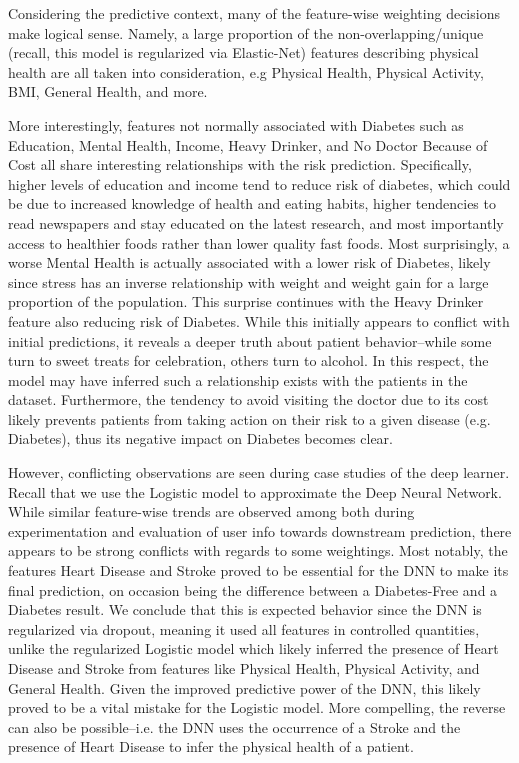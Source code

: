 \documentclass[conference]{IEEEtran}
\begin{document}
    Considering the predictive context, many of the feature-wise weighting decisions make logical sense. Namely, a large proportion of the non-overlapping/unique (recall, this model is regularized via Elastic-Net) features describing physical health are all taken into consideration, e.g Physical Health, Physical Activity, BMI, General Health, and more.

    More interestingly, features not normally associated with Diabetes such as Education, Mental Health, Income, Heavy Drinker, and No Doctor Because of Cost all share interesting relationships with the risk prediction. Specifically, higher levels of education and income tend to reduce risk of diabetes, which could be due to increased knowledge of health and eating habits, higher tendencies to read newspapers and stay educated on the latest research, and most importantly access to healthier foods rather than lower quality fast foods. Most surprisingly, a worse Mental Health is actually associated with a lower risk of Diabetes, likely since stress has an inverse relationship with weight and weight gain for a large proportion of the population. This surprise continues with the Heavy Drinker feature also reducing risk of Diabetes. While this initially appears to conflict with initial predictions, it reveals a deeper truth about patient behavior--while some turn to sweet treats for celebration, others turn to alcohol. In this respect, the model may have inferred such a relationship exists with the patients in the dataset. Furthermore, the tendency to avoid visiting the doctor due to its cost likely prevents patients from taking action on their risk to a given disease (e.g. Diabetes), thus its negative impact on Diabetes becomes clear.

    However, conflicting observations are seen during case studies of the deep learner. Recall that we use the Logistic model to approximate the Deep Neural Network. While similar feature-wise trends are observed among both during experimentation and evaluation of user info towards downstream prediction, there appears to be strong conflicts with regards to some weightings. Most notably, the features Heart Disease and Stroke proved to be essential for the DNN to make its final prediction, on occasion being the difference between a Diabetes-Free and a Diabetes result. We conclude that this is expected behavior since the DNN is regularized via dropout, meaning it used all features in controlled quantities, unlike the regularized Logistic model which likely inferred the presence of Heart Disease and Stroke from features like Physical Health, Physical Activity, and General Health. Given the improved predictive power of the DNN, this likely proved to be a vital mistake for the Logistic model. More compelling, the reverse can also be possible--i.e. the DNN uses the occurrence of a Stroke and the presence of Heart Disease to infer the physical health of a patient.
\end{document}
